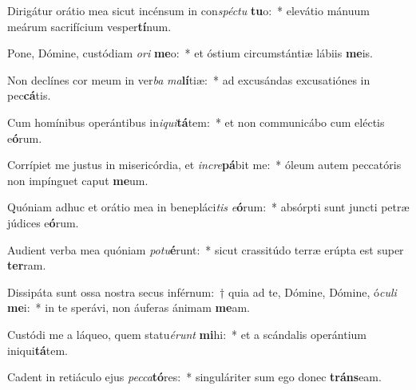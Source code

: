 \item Dirigátur orátio mea sicut incénsum in con\textit{spéc}\textit{tu} \textbf{tu}o:~* elevátio mánuum meárum sacrifícium vesper\textbf{tí}num.
\item Pone, Dómine, custódiam \textit{o}\textit{ri} \textbf{me}o:~* et óstium circumstántiæ lábiis \textbf{me}is.
\item Non declínes cor meum in ver\textit{ba} \textit{ma}\textbf{lí}tiæ:~* ad excusándas excusatiónes in pec\textbf{cá}tis.
\item Cum homínibus operántibus in\textit{i}\textit{qui}\textbf{tá}tem:~* et non communicábo cum eléctis e\textbf{ó}rum.
\item Corrípiet me justus in misericórdia, et \textit{in}\textit{cre}\textbf{pá}bit me:~* óleum autem peccatóris non impínguet caput \textbf{me}um.
\item Quóniam adhuc et orátio mea in benepláci\textit{tis} \textit{e}\textbf{ó}rum:~* absórpti sunt juncti petræ júdices e\textbf{ó}rum.
\item Audient verba mea quóniam \textit{pot}\textit{u}\textbf{é}runt:~* sicut crassitúdo terræ erúpta est super \textbf{ter}ram.
\item Dissipáta sunt ossa nostra secus inférnum:~† quia ad te, Dómine, Dómine, ó\textit{cu}\textit{li} \textbf{me}i:~* in te sperávi, non áuferas ánimam \textbf{me}am.
\item Custódi me a láqueo, quem statu\textit{é}\textit{runt} \textbf{mi}hi:~* et a scándalis operántium iniqui\textbf{tá}tem.
\item Cadent in retiáculo ejus \textit{pec}\textit{ca}\textbf{tó}res:~* singuláriter sum ego donec \textbf{tráns}eam.
